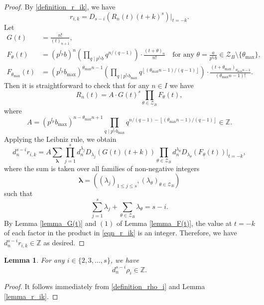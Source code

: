 \documentclass[12pt]{article}
\newtheorem{lemma}[theorem]{Lemma}
\numberwithin{equation}{section}
\begin{document}
\begin{proof}
By \eqref{definition_r_ik}, we have
\[r_{i,k} = D_{s-i}(R_n(t)(t+k)^{s})\big|_{t=-k}.\]
Let
\begin{align}
G(t) &= \frac{n!}{(t)_{n+1}}, \label{def_G(t)}\\
F_{\theta}(t) &= (p^{l_p}b)^{n}\left(\prod_{q \mid p^{l_p}b} q^{n/(q-1)}\right) \cdot \frac{(t+\theta)_{n}}{n!} \quad\text{for any~} \theta = \frac{a}{p^{l_p}b} \in \mathcal{Z}_B \setminus \{\theta_{\max}\}, \label{def_F_theta(t)}\\
F_{\theta_{\max}}(t) &= (p^{l_p}b_{\max})^{\theta_{\max}n-1}\left(\prod_{q \mid p^{l_p}b_{\max}} q^{\left\lfloor{(\theta_{\max}n-1)/(q-1)}\right\rfloor}\right)\cdot \frac{(t+\theta_{\max})_{\theta_{\max}n-1}}{(\theta_{\max}n-1)!}. \label{def_F_theta_max(t)}
\end{align}
Then it is straightforward to check that for any $n \in I$ we have
\begin{equation}\label{Rn(t)_building_blocks}
R_n(t) = A \cdot G(t)^s \prod_{\theta \in \mathcal{Z}_B} F_{\theta}(t), 
\end{equation}
where
\[ A = (p^{l_p}b_{\max})^{n-\theta_{\max}n+1}\prod_{q \mid p^{l_p}b_{\max}} q^{n/(q-1)-\left\lfloor{(\theta_{\max}n-1)/(q-1)}\right\rfloor} \in \mathbb{Z}. \]
Applying the Leibniz rule, we obtain
\begin{equation}\label{eqn_r_ik}
d_n^{s-i}r_{i,k} = A\sum_{\boldsymbol{\lambda}}\prod_{j=1}^{s}d_n^{\lambda_j}D_{\lambda_j}(G(t)(t+k))\prod_{\theta \in \mathcal{Z}_B}d_n^{\lambda_{\theta}}D_{\lambda_{\theta}}(F_{\theta}(t)) \big|_{t=-k},
\end{equation}
where the sum is taken over all families of non-negative integers 
\[\boldsymbol{\lambda} = ((\lambda_{j})_{1 \leqslant j \leqslant s},(\lambda_{\theta})_{\theta \in \mathcal{Z}_B})\] 
such that
\[ \sum_{j=1}^{s} \lambda_j + \sum_{\theta \in \mathcal{Z}_B} \lambda_{\theta} = s-i. \]
By Lemma \ref{lemma_G(t)} and $(1)$ of Lemma \ref{lemma_F(t)}, the value at $t=-k$ of each factor in the product in \eqref{eqn_r_ik} is an integer. Therefore, we have $d_n^{s-i}r_{i,k} \in \mathbb{Z}$ as desired. 
\end{proof}

\begin{lemma}\label{lemma_rho_i}
For any $i \in \{2,3,\ldots,s\}$, we have
\[ d_n^{s-i} \rho_{i} \in \mathbb{Z}. \]
\end{lemma}

\begin{proof}
It follows immediately from \eqref{definition_rho_i} and Lemma \ref{lemma_r_ik}.
\end{proof}
\end{document}
